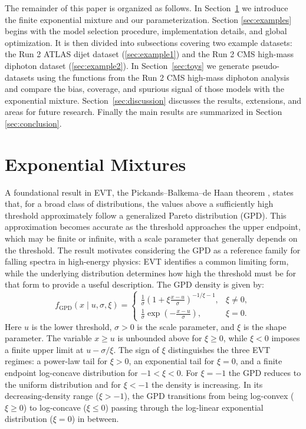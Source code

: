 \documentclass[a4paper,11pt]{article}
\begin{document}
The remainder of this paper is organized as follows. In Section~\ref{sec:emm} we introduce the 
finite exponential mixture and our parameterization. Section \ref{sec:examples} begins with the model selection procedure, implementation details, and global optimization. It is then divided into subsections covering two example datasets: the Run 2 ATLAS dijet dataset (\ref{sec:example1}) and the Run 2 CMS high-mass diphoton dataset (\ref{sec:example2}). In 
Section~\ref{sec:toys} we generate pseudo-datasets using the functions from the Run 2 CMS high-mass diphoton analysis and compare the bias, coverage, and spurious signal of those models 
with the exponential mixture. Section~\ref{sec:discussion} discusses the results, extensions, and areas for future research. Finally the main results are summarized in Section \ref{sec:conclusion}.

\section{Exponential Mixtures}
\label{sec:emm}

A foundational result in EVT, the Pickands–Balkema–de Haan theorem \cite{Picklands_1975, Balkema_Haan_1974}, states that, for a broad class of distributions, the values above a sufficiently high threshold approximately follow a generalized Pareto distribution (GPD). This approximation becomes accurate as the threshold approaches the upper endpoint, which may be finite or infinite, with a scale parameter that generally depends on the threshold. The result motivates considering the GPD as a reference family for falling spectra in high-energy physics: EVT identifies a common limiting form, while the underlying distribution determines how high the threshold must be for that form to provide a useful description. The GPD density is given by:
\begin{equation}
    f_{\mathrm{GPD}}(x \mid u,\sigma,\xi) =
    \begin{cases}
        \displaystyle
        \frac{1}{\sigma}
        \left(1+\xi\frac{x-u}{\sigma}\right)^{-1/\xi-1},
        & \xi \ne 0, \\[6pt]
        \displaystyle
        \frac{1}{\sigma}
        \exp\left(-\frac{x-u}{\sigma}\right),
        & \xi = 0.
    \end{cases}
    \label{eq:gpd}
\end{equation}
Here $u$ is the lower threshold, $\sigma>0$ is the scale parameter,
and $\xi$ is the shape parameter. The variable $x\ge u$ is unbounded
above for $\xi\ge0$, while $\xi<0$ imposes a finite upper limit at
$u-\sigma/\xi$. The sign of $\xi$ distinguishes the three EVT regimes:
a power-law tail for $\xi>0$, an exponential tail for $\xi=0$, and a finite endpoint log-concave distribution for $-1<\xi<0$. For $\xi=-1$ the GPD reduces to the uniform distribution and for $\xi<-1$ the density is increasing. In its decreasing-density range ($\xi>-1$), the GPD transitions from being log-convex ($\xi\geq0$) to log-concave ($\xi\leq0$) passing through the log-linear exponential distribution ($\xi=0$) in between.
\end{document}
